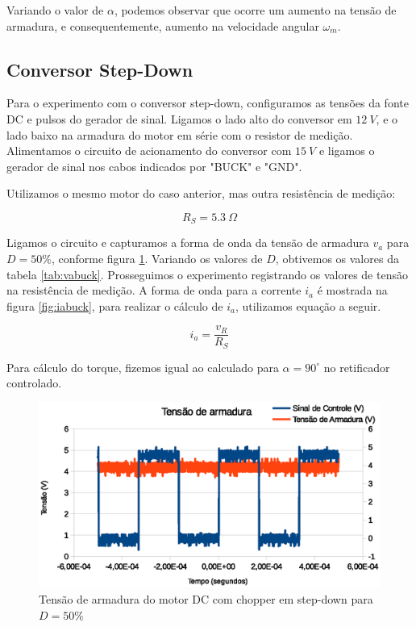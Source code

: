 \documentclass{article}
\begin{document}

Variando o valor de $\alpha$, podemos observar que ocorre um aumento na tensão de armadura, e consequentemente, aumento na velocidade angular $\omega_m$. 


\subsection{Conversor Step-Down}
Para o experimento com o conversor step-down, configuramos as tensões da fonte DC e pulsos do gerador de sinal. Ligamos o lado alto do conversor em $12\ V$, e o lado baixo na armadura do motor em série com o resistor de medição. Alimentamos o circuito de acionamento do conversor com $15\ V$ e ligamos o gerador de sinal nos cabos indicados por "BUCK" e "GND".

Utilizamos o mesmo motor do caso anterior, mas outra resistência de medição:

\begin{equation}
R_S=5.3\ \Omega
\end{equation}

Ligamos o circuito e capturamos a forma de onda da tensão de armadura $v_a$ para $D=50\%$, conforme figura \ref{fig:vabuck}. Variando os valores de $D$, obtivemos os valores da tabela \ref{tab:vabuck}. Prosseguimos o experimento registrando os valores de tensão na resistência de medição. A forma de onda para a corrente $i_a$ é mostrada na figura \ref{fig:iabuck}, para realizar o cálculo de $i_a$, utilizamos equação a seguir.

\begin{equation}
i_a=\frac{v_R}{R_S}
\end{equation}

Para cálculo do torque, fizemos igual ao calculado para $\alpha=90^\circ$ no retificador controlado.

\begin{figure}[H]
	\centering
	\includegraphics[width=\linewidth]{Dados/Buck/va}
	\caption{Tensão de armadura do motor DC com chopper em step-down para $D=50\%$}
	\label{fig:vabuck}
\end{figure}
\end{document}
